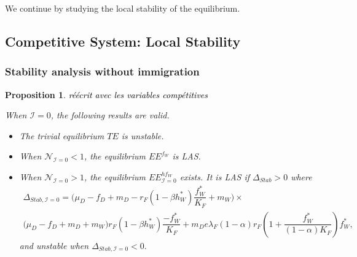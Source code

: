 \documentclass{article}
\newcommand{\lfw}{\lambda_{F}}
\newcommand{\lfw}{\lambda_{F}}
\newcommand{\cI}{\mathcal{I}}
\newcommand{\vdeux}[1]{\textcolor{black}{#1}}
\newtheorem{prop}[theorem]{Proposition}
\theoremstyle{definition}
\theoremstyle{remark}
\begin{document}
We continue by studying the local stability of the equilibrium.

\subsection{Competitive System: Local Stability}

\subsubsection{Stability analysis without immigration}
\begin{prop}\label{prop:stab, cI=0}
\vdeux{réécrit avec les variables compétitives}

 When $\cI = 0$, the following results are valid.
\begin{itemize}
\item The trivial equilibrium $TE$ is unstable.
\item When $\mathcal{N}_{\cI = 0} < 1$, the equilibrium $EE^{f_W}$ is LAS.
\item When $\mathcal{N}_{\cI = 0} > 1$, the equilibrium $EE^{hf_W}_{\cI =0}$ exists. It is LAS if $\Delta_{Stab} > 0$ where 
\begin{multline}
\Delta_{Stab, \cI =0} = \Big(\mu_D - f_D + m_D - r_F (1-\beta h_W^*) \dfrac{f_W^*}{K_F} + m_W\Big) \times \\ \big( \mu_D  -f_D + m_D + m_W \big) r_F(1 - \beta h_W^*) \dfrac{-f^*_W}{K_F} + 
m_D e \lfw (1- \alpha) r_F \left(1 + \dfrac{f_W^*}{(1- \alpha)K_F}\right) f_W^*,
\label{eq:deltaStab, I=0}
\end{multline}
and unstable when $\Delta_{Stab, \cI =0} < 0.$
\end{itemize}
\end{prop}
\end{document}
